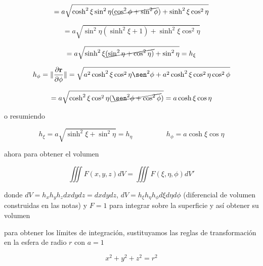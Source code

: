 \documentclass[12pt,a4paper]{article}
\providecommand{\norm}[1]{\lVert#1\rVert}
\begin{document}
\begin{enumerate}
        \begin{equation*}
           =a\sqrt{\cosh^2{\xi}\sin^2{\eta}(\cancel{\cos^2{\phi} + \sin^2{\phi}}) + \sinh^2{\xi} \cos^2{\eta}}
        \end{equation*}
        
        \begin{equation*}
            = a \sqrt{\sin^2{\eta} (\sinh^2{\xi} + 1) + \sinh^2{\xi} \cos^2{\eta}}
        \end{equation*}
        
        \begin{equation*}
            = a\sqrt{\sinh^2{\xi}\cancel{(\sin^2{\eta} + \cos^2{\eta})}+\sin^2{\eta}} = h_\xi
        \end{equation*}
        
        \begin{equation*}
            h_\phi = \norm{\frac{\partial \textbf{r}}{\partial \phi}} = \sqrt{a^2\cosh^2{\xi}\cos^2{\eta}\sen^2{\phi} + a^2 \cosh^2{\xi}\cos^2{\eta}\cos^2{\phi}}
        \end{equation*}
        
        \begin{equation*}
            = a \sqrt{\cosh^2{\xi}\cos^2{\eta}(\cancel{\sen^2{\phi} + \cos^2{\phi}})} = a \cosh{\xi}\cos{\eta}
        \end{equation*}
        
    o resumiendo
    
    \begin{equation*}
        h_\xi = a \sqrt{\sinh^2{\xi}+ \sin^2{\eta}} = h_\eta   \hspace{2cm} h_\phi = a \cosh{\xi}\cos{\eta}
    \end{equation*}
        
    
    ahora para obtener el volumen 
    
    \begin{equation*}
        \iiint F(x,y,z) dV = \iiint F(\xi,\eta,\phi)  dV' 
    \end{equation*}
    
    donde $dV = h_x h_y h_z dxdydz = dxdydz$, $dV= h_\xi h_\eta h_\phi d\xi d\eta d\phi$ (diferencial de volumen construidas en las notas) y $F = 1$ para integrar sobre la superficie y así obtener su volumen 
    
    
    para obtener los límites de integración, sustituyamos las reglas de transformación en la esfera de radio $r$ con $a= 1$
    
    \begin{equation*}
        x^2 + y^2 + z^2 = r^2
    \end{equation*}
    

\end{enumerate}
\end{document}
